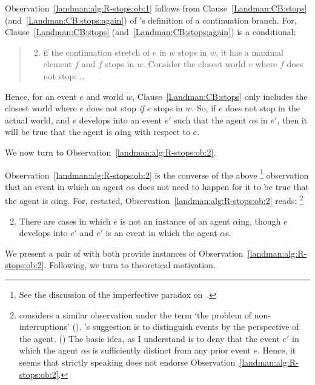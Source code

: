 \begin{note}
  Observation~\ref{landman:alg:R-stops:ob:1} follows from  Clause~\ref{Landman:CB:stops} (and~\ref{Landman:CB:stops:again}) of \citeauthor{Landman:1992wh}'s definition of a continuation branch.
  For, Clause~\ref{Landman:CB:stops} (and~\ref{Landman:CB:stops:again}) is a conditional:
  \begin{quote}
    \begin{enumerate}
      \setcounter{enumi}{1}
    \item
      if the continuation stretch of \(e\) in \(w\) stops in \(w\), it has a maximal element \(f\) and \(f\) stops in \(w\).
      Consider the closest world \(v\) where \(f\) does not stop: \dots
    \end{enumerate}
  \end{quote}
  Hence, for an event \(e\) and world \(w\), Clause~\ref{Landman:CB:stops} only includes the closest world where \(e\) does not stop \emph{if} \(e\) stops in \(w\).
  So, if \(e\) does not stop in the actual world, and \(e\) develops into an event \(e'\) such that the agent \(\alpha\)s in \(e'\), then it will be true that the agent is \(\alpha\)ing with respect to \(e\).
\end{note}

\begin{note}
  We now turn to Observation~\ref{landman:alg:R-stops:ob:2}.

  Observation~\ref{landman:alg:R-stops:ob:2} is the converse of the above%
  \footnote{
    See the discussion of the imperfective paradox on~.
  }
  observation that an event in which an agent \(\alpha\)s does not need to happen for it to be true that the agent is \(\alpha\)ing.
  For, restated, Observation~\ref{landman:alg:R-stops:ob:2} reads:%
  \footnote{
    \citeauthor{Landman:1992wh} considers a similar observation under the term `the problem of non-interruptions' (\citeyear[14--17,30--31]{Landman:1992wh}).
    \citeauthor{Landman:1992wh}'s suggestion is to distinguish events by the perspective of the agent. (\citeyear[31]{Landman:1992wh})
    The basic idea, as I understand \citeauthor{Landman:1992wh} is to deny that the event \(e'\) in which the agent \(\alpha\)s is sufficiently distinct from any prior event \(e\).
    Hence, it seems that strictly speaking \citeauthor{Landman:1992wh} does not endorse Observation~\ref{landman:alg:R-stops:ob:2}.
  }
  \begin{enumerate}[label=\arabic*\('\)., ref=(\arabic*\('\))]
    \setcounter{enumi}{1}
  \item
    There are cases in which \(e\) is not an instance of an agent \(\alpha\)ing, though \(e\) develops into \(e'\) and \(e'\) is an event in which the agent \(\alpha\)s.
  \end{enumerate}

    We present a pair of  with both provide instances of Observation~\ref{landman:alg:R-stops:ob:2}.
    Following, we turn to theoretical motivation.
\end{note}

